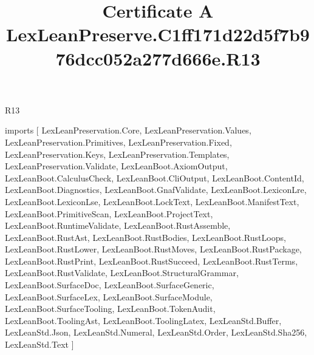 \begin{lexlean}{R13}
\title{Certificate A LexLeanPreserve.C1ff171d22d5f7b976dcc052a277d666e.R13}
\begin{coremodule}
imports [
  LexLeanPreservation.Core,
  LexLeanPreservation.Values,
  LexLeanPreservation.Primitives,
  LexLeanPreservation.Fixed,
  LexLeanPreservation.Keys,
  LexLeanPreservation.Templates,
  LexLeanPreservation.Validate,
  LexLeanBoot.AxiomOutput,
  LexLeanBoot.CalculusCheck,
  LexLeanBoot.CliOutput,
  LexLeanBoot.ContentId,
  LexLeanBoot.Diagnostics,
  LexLeanBoot.GnafValidate,
  LexLeanBoot.LexiconLre,
  LexLeanBoot.LexiconLse,
  LexLeanBoot.LockText,
  LexLeanBoot.ManifestText,
  LexLeanBoot.PrimitiveScan,
  LexLeanBoot.ProjectText,
  LexLeanBoot.RuntimeValidate,
  LexLeanBoot.RustAssemble,
  LexLeanBoot.RustAst,
  LexLeanBoot.RustBodies,
  LexLeanBoot.RustLoops,
  LexLeanBoot.RustLower,
  LexLeanBoot.RustMoves,
  LexLeanBoot.RustPackage,
  LexLeanBoot.RustPrint,
  LexLeanBoot.RustSucceed,
  LexLeanBoot.RustTerms,
  LexLeanBoot.RustValidate,
  LexLeanBoot.StructuralGrammar,
  LexLeanBoot.SurfaceDoc,
  LexLeanBoot.SurfaceGeneric,
  LexLeanBoot.SurfaceLex,
  LexLeanBoot.SurfaceModule,
  LexLeanBoot.SurfaceTooling,
  LexLeanBoot.TokenAudit,
  LexLeanBoot.ToolingAst,
  LexLeanBoot.ToolingLatex,
  LexLeanStd.Buffer,
  LexLeanStd.Json,
  LexLeanStd.Numeral,
  LexLeanStd.Order,
  LexLeanStd.Sha256,
  LexLeanStd.Text
]


\end{coremodule}
\end{lexlean}
